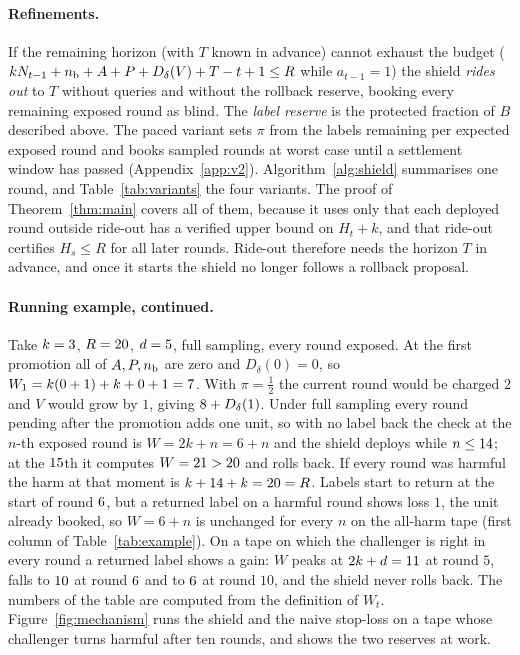 \documentclass[10pt]{article}
\theoremstyle{plain}
\theoremstyle{definition}
\begin{document}
\paragraph{Refinements.}
If the remaining horizon (with $T$ known in advance) cannot exhaust the budget ($kN_{t-1}+n_{\rm b}+A+P+D_\delta(V)+T-t+1\le R$ while $a_{t-1}=1$) the shield \emph{rides out} to $T$ without queries and without the rollback reserve, booking every remaining exposed round as blind. The \emph{label reserve} is the protected fraction of $B$ described above. The paced variant sets $\pi$ from the labels remaining per expected exposed round and books sampled rounds at worst case until a settlement window has passed (Appendix~\ref{app:v2}). Algorithm~\ref{alg:shield} summarises one round, and Table~\ref{tab:variants} the four variants. The proof of Theorem~\ref{thm:main} covers all of them, because it uses only that each deployed round outside ride-out has a verified upper bound on $H_t+k$, and that ride-out certifies $H_s\le R$ for all later rounds. Ride-out therefore needs the horizon $T$ in advance, and once it starts the shield no longer follows a rollback proposal.

\paragraph{Running example, continued.}
Take $k=3$, $R=20$, $d=5$, full sampling, every round exposed. At the first promotion all of $A,P,n_{\rm b}$ are zero and $D_\delta(0)=0$, so $W_1=k(0+1)+k+0+1=7$. With $\pi=\tfrac12$ the current round would be charged $2$ and $V$ would grow by $1$, giving $8+D_\delta(1)$. Under full sampling every round pending after the promotion adds one unit, so with no label back the check at the $n$-th exposed round is $W=2k+n=6+n$ and the shield deploys while $n\le14$; at the $15$th it computes $W=21>20$ and rolls back. If every round was harmful the harm at that moment is $k+14+k=20=R$. Labels start to return at the start of round $6$, but a returned label on a harmful round shows loss $1$, the unit already booked, so $W=6+n$ is unchanged for every $n$ on the all-harm tape (first column of Table~\ref{tab:example}). On a tape on which the challenger is right in every round a returned label shows a gain: $W$ peaks at $2k+d=11$ at round $5$, falls to $10$ at round $6$ and to $6$ at round $10$, and the shield never rolls back. The numbers of the table are computed from the definition of $W_t$. Figure~\ref{fig:mechanism} runs the shield and the naive stop-loss on a tape whose challenger turns harmful after ten rounds, and shows the two reserves at work.
\end{document}
